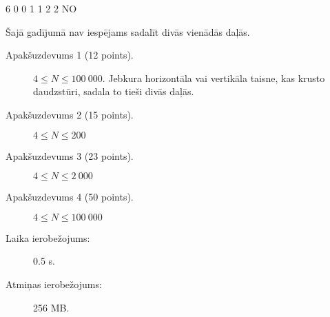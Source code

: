 \documentclass{boi2014-lv}
\begin{document}
	\example
	{
		6  0  0  1  1  2  2
	}
	{
		NO
	}
    {
        Šajā gadījumā nav iespējams sadalīt divās vienādās daļās.
        \begin{center}
        \end{center}
    }


    \Scoring

    \begin{description}
        \item[Apakšuzdevums 1 (12 points).] $4 \le N \le 100\ 000$.
	Jebkura horizontāla vai vertikāla taisne, kas krusto daudzstūri, sadala to tieši divās daļās.

        \item[Apakšuzdevums 2 (15 points).] $4 \le N \le 200$
        \item[Apakšuzdevums 3 (23 points).] $4 \le N \le 2\ 000$
        \item[Apakšuzdevums 4 (50 points).] $4 \le N \le 100\ 000$
    \end{description}

    \Constraints

    \begin{description}
        \item[Laika ierobežojums:] 0.5 s.
        \item[Atmiņas ierobežojums:] 256 MB.
    \end{description}
\end{document}
